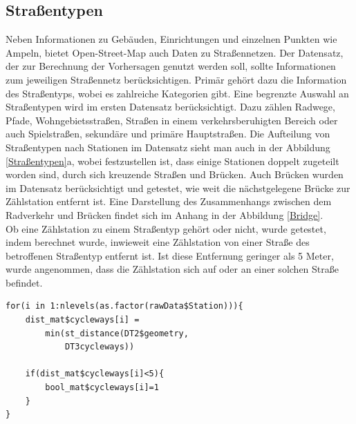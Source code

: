 \documentclass[a4paper,12pt]{thesis}
\begin{document}
\subsection{Straßentypen}

Neben Informationen zu Gebäuden, Einrichtungen und einzelnen Punkten wie Ampeln, bietet Open-Street-Map auch Daten zu Straßennetzen. Der Datensatz, der zur Berechnung der Vorhersagen genutzt werden soll, sollte Informationen zum jeweiligen Straßennetz berücksichtigen. Primär gehört dazu die Information des Straßentyps, wobei es zahlreiche Kategorien gibt. Eine begrenzte Auswahl an Straßentypen wird im ersten Datensatz berücksichtigt. Dazu zählen Radwege, Pfade, Wohngebietsstraßen, Straßen in einem verkehrsberuhigten Bereich oder auch Spielstraßen, sekundäre und primäre Hauptstraßen. Die Aufteilung von Straßentypen nach Stationen im Datensatz sieht man auch in der Abbildung \ref{Straßentypen}a, wobei festzustellen ist, dass einige Stationen doppelt zugeteilt worden sind, durch sich kreuzende Straßen und Brücken. Auch Brücken wurden im Datensatz berücksichtigt und getestet, wie weit die nächstgelegene Brücke zur Zählstation entfernt ist. Eine Darstellung des Zusammenhangs zwischen dem Radverkehr und Brücken findet sich im Anhang in der Abbildung \ref{Bridge}.\\

Ob eine Zählstation zu einem Straßentyp gehört oder nicht, wurde getestet, indem berechnet wurde, inwieweit eine Zählstation von einer Straße des betroffenen Straßentyp entfernt ist. Ist diese Entfernung geringer als 5 Meter, wurde angenommen, dass die Zählstation sich auf oder an einer solchen Straße befindet. 

\begin{minipage}{\linewidth}
\begin{lstlisting}[caption={Teste den Straßentyp},label=code:streettype_a]
for(i in 1:nlevels(as.factor(rawData$Station))){
	dist_mat$cycleways[i] =
		min(st_distance(DT2$geometry, 
			DT3cycleways))
			
	if(dist_mat$cycleways[i]<5){
		bool_mat$cycleways[i]=1
	}
}
\end{lstlisting}
\end{minipage}
\end{document}
